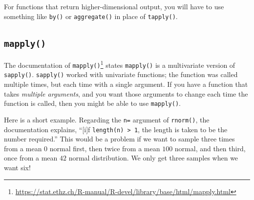 \documentclass[
  12pt,
  krantz2]{krantz}
\makeatletter
\newenvironment{Shaded}{\begin{snugshade}}{\end{snugshade}}
\newcommand{\DocumentationTok}[1]{\textcolor[rgb]{0.37,0.37,0.37}{\textbf{\textit{#1}}}}
\newcommand{\FunctionTok}[1]{\textcolor[rgb]{0,0,0}{#1}}
\newcommand{\NormalTok}[1]{#1}
\newcommand{\SpecialCharTok}[1]{\textcolor[rgb]{0,0,0}{#1}}
\renewcommand{\href}[2]{#2\footnote{\url{#1}}}
\newenvironment{kframe}{%
\medskip{}
\setlength{\fboxsep}{.8em}
 \def\at@end@of@kframe{}%
 \ifinner\ifhmode%
  \def\at@end@of@kframe{\end{minipage}}%
  \begin{minipage}{\columnwidth}%
 \fi\fi%
 \def\FrameCommand##1{\hskip\@totalleftmargin \hskip-\fboxsep
 \colorbox{shadecolor}{##1}\hskip-\fboxsep
     \hskip-\linewidth \hskip-\@totalleftmargin \hskip\columnwidth}%
 \MakeFramed {\advance\hsize-\width
   \@totalleftmargin\z@ \linewidth\hsize
   \@setminipage}}%
 {\par\unskip\endMakeFramed%
 \at@end@of@kframe}
\renewenvironment{Shaded}{\begin{kframe}}{\end{kframe}}
\makeatother
\begin{document}
\begin{Shaded}
\end{Shaded}

For functions that return higher-dimensional output, you will have to use something like \texttt{by()} or \texttt{aggregate()} in place of \texttt{tapply()}.

\hypertarget{mapply}{%
\subsection{\texorpdfstring{\texttt{mapply()}}{mapply()}}\label{mapply}}

The \href{https://stat.ethz.ch/R-manual/R-devel/library/base/html/mapply.html}{documentation of \texttt{mapply()}} states \texttt{mapply()} is a multivariate version of \texttt{sapply()}. \texttt{sapply()} worked with univariate functions; the function was called multiple times, but each time with a single argument. If you have a function that takes \emph{multiple arguments}, and you want those arguments to change each time the function is called, then you might be able to use \texttt{mapply()}.

Here is a short example. Regarding the \texttt{n=} argument of \texttt{rnorm()}, the documentation explains, ``{[}i{]}f \texttt{length(n)\ \textgreater{}\ 1}, the length is taken to be the number required.'' This would be a problem if we want to sample three times from a mean \(0\) normal first, then twice from a mean \(100\) normal, and then third, once from a mean \(42\) normal distribution. We only get three samples when we want six!
\end{document}
